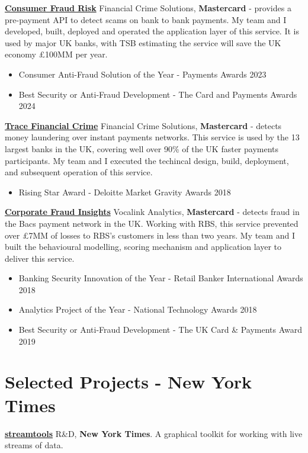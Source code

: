 \documentclass[line, overlapped]{res}
\providecommand{\tightlist}{%
  \setlength{\itemsep}{0pt}\setlength{\parskip}{0pt}}
\begin{document}
\begin{resume}
	\href{https://www.bloomberg.com/news/articles/2023-07-05/mastercard-s-ai-tool-helps-nine-british-banks-tackle-scams}{\textbf{Consumer Fraud Risk}} Financial Crime Solutions, \textbf{Mastercard} - provides a pre-payment API to detect scams on bank to bank payments. My team and I developed, built, deployed and operated the application layer of this service. It is used by major UK banks, with TSB estimating the service will save the UK economy £100MM per year.
  \begin{itemize}
  \tightlist
  \item
    Consumer Anti-Fraud Solution of the Year - Payments Awards 2023
  \item
    Best Security or Anti-Fraud Development - The Card and Payments
    Awards 2024
  \end{itemize}
	\href{https://www.vocalink.com/news-insights/case-studies/case-study-mits/}{\textbf{Trace Financial Crime}} Financial Crime Solutions, \textbf{Mastercard} - detects money laundering over instant payments networks. This service is used by the 13 largest banks in the UK, covering well over 90\% of the UK faster payments participants. My team and I executed the techincal design, build, deployment, and subsequent operation of this service.

  \begin{itemize}
  \tightlist
  \item
    Rising Star Award - Deloitte Market Gravity Awards 2018
  \end{itemize}
	\href{https://www.thetimes.co.uk/article/rbs-system-pushes-back-against-invoice-fraudsters-88h92l5ml}{\textbf{Corporate Fraud Insights}} Vocalink Analytics, \textbf{Mastercard} - detects fraud in the Bacs payment network in the UK. Working with RBS, this service prevented over £7MM of losses to RBS’s customers in less than two years. My team and I built the behavioural modelling, scoring mechanism and application layer to deliver this service. 

  \begin{itemize}
  \tightlist
  \item
    Banking Security Innovation of the Year - Retail Banker
    International Awards 2018
  \item
    Analytics Project of the Year - National Technology Awards 2018
  \item
    Best Security or Anti-Fraud Development - The UK Card \& Payments
    Award 2019
  \end{itemize}
\section{Selected Projects - New York Times}
	\href{https://github.com/nytlabs/streamtools}{\textbf{streamtools}} R\&D, \textbf{New York Times}. A graphical toolkit for working with live streams of data.


\end{resume}
\end{document}
